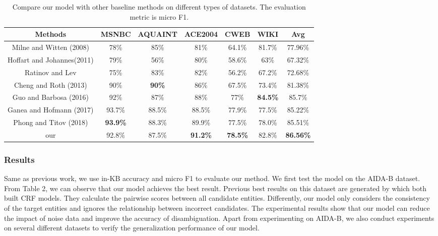 \documentclass[sigconf]{acmart}
\begin{document}
\begin{table*}[tp]
\caption{Compare our model with other baseline methods on different types of datasets. The evaluation metric is micro F1.
}
\renewcommand\arraystretch{1}
\newcommand{\tabincell}[2]{\begin{tabular}{@{}#1@{}}#2\end{tabular}}
\centering
\begin{tabular}{|c|c|c|c|c|c|c|} 
\hline
{Methods}  & {MSNBC}  & {AQUAINT}  & {ACE2004}  & {CWEB}  & {WIKI}& {Avg} \\
\hline  
Milne and Witten (2008)\cite{MilneW08}  & 78\%  & 85\%  &  81\%  & 64.1\%  &  81.7\%  & 77.96\% \\
\hline 
Hoffart and Johannes(2011)\cite{HoffartYBFPSTTW11}  & 79\%  & 56\%  & 80\%  & 58.6\%  & 63\%  & 67.32\% \\
\hline 
Ratinov and Lev\cite{RatinovRDA11}   & 75\%  & 83\%  & 82\%  & 56.2\%  & 67.2\%  & 72.68\% \\
\hline 
Cheng and Roth (2013)\cite{ChengR13}  & 90\%  & {\bfseries 90\%}  & 86\%  & 67.5\%  & 73.4\%  & 81.38\% \\
\hline 
Guo and Barbosa (2016)\cite{GuoB18}  & 92\%  & 87\%  & 88\%  & 77\%  & {\bfseries 84.5\%}  & 85.7\% \\
\hline 
Ganea and Hofmann (2017)\cite{GaneaH17}  & 93.7\%  & 88.5\%  & 88.5\%  & 77.9\%  & 77.5\%  & 85.22\% \\
\hline 
Phong and Titov (2018)\cite{TitovL18a}  & {\bfseries 93.9\%}  & 88.3\%  & 89.9\%  & 77.5\% & 78.0\%  & 85.51\% \\
\hline
our  & 92.8\%   & 87.5\%  & {\bfseries 91.2\%}  & {\bfseries 78.5\%}  &  82.8\%  & {\bfseries 86.56\%}  \\
\hline

\end{tabular}
\setlength{\abovecaptionskip}{8pt}
\end{table*} 

\subsubsection*{Results}
Same as previous work, we use in-KB accuracy and micro F1 to evaluate our method. We first test the model on the AIDA-B dataset. From Table 2, we can observe that our model achieves the best result. Previous best results on this dataset are generated by \cite{GaneaH17, TitovL18a} which both built CRF models. They calculate the pairwise scores between all candidate entities. Differently, our model only considers the consistency of the target entities and ignores the relationship between incorrect candidates. The experimental results show that our model can reduce the impact of noise data and improve the accuracy of disambiguation. Apart from experimenting on AIDA-B, we also conduct experiments on several different datasets to verify the generalization performance of our model. 
\end{document}
